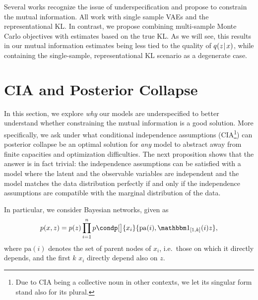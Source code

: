 Several works \citep{alemi2017fixing,zhao2019infovae,mccarthy2019improved,rezaabad2020learning,serdega2020vmi} recognize the issue of underspecification and propose to constrain the mutual information.
All work with single sample VAEs and the representational KL.
In contrast, we propose combining multi-sample Monte Carlo objectives with  estimates based on the true KL.
As we will see, this results in our mutual information estimates being less tied to the quality of $q(z\hspace{0.08em}|\hspace{0.11em} x)$, while containing the single-sample, representational KL scenario as a degenerate case.

\section{CIA and Posterior Collapse}
\label{sec:cia-an-pc}

In this section, we explore \emph{why} our models are underspecified to better understand whether constraining the mutual information is a good solution.
More specifically, we ask under what conditional independence assumptions (CIA\footnote{Due to CIA being a collective noun in other contexts, we let its singular form stand also for its plural.}) can posterior collapse be an optimal solution for \emph{any} model to abstract away from finite capacities and optimization difficulties.
The next proposition shows that the answer is in fact trivial: the independence assumptions can be satisfied with a model where the latent and the observable variables are independent and the model matches the data distribution perfectly if and only if the independence assumptions are compatible with the marginal distribution of the data.

In particular, we consider Bayesian networks, given as 
\begin{align*}
p(x,z)=p(z) \prod_{i=1}^n p\condp[\big]{x_i}{\mathrm{pa}(i),\indcia},
\end{align*}
where $\mathrm{pa}(i)$ denotes the set of parent nodes of $x_i$, i.e.\ those on which it directly depends, and the first $k$ $x_i$ directly depend also on $z$.

